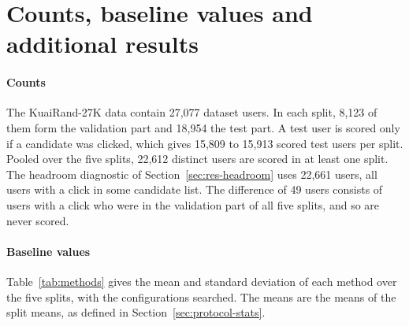 \documentclass[preprint,12pt,authoryear]{elsarticle}
\begin{document}
\section{Counts, baseline values and additional results}
\label{app:counts}

\paragraph{Counts} The KuaiRand-27K data contain 27,077 dataset users. In each split, 8,123 of them form the validation part and 18,954 the test
part. A test user is scored only if a candidate was clicked, which gives 15,809 to 15,913 scored test users per split. Pooled over the five splits,
22,612 distinct users are scored in at least one split. The headroom diagnostic of Section~\ref{sec:res-headroom} uses 22,661 users, all users with
a click in some candidate list. The difference of 49 users consists of users with a click who were in the validation part of all five splits, and
so are never scored.

\paragraph{Baseline values} Table~\ref{tab:methods} gives the mean and standard deviation of each method over the five splits, with the configurations
searched. The means are the means of the split means, as defined in Section~\ref{sec:protocol-stats}.
\end{document}

